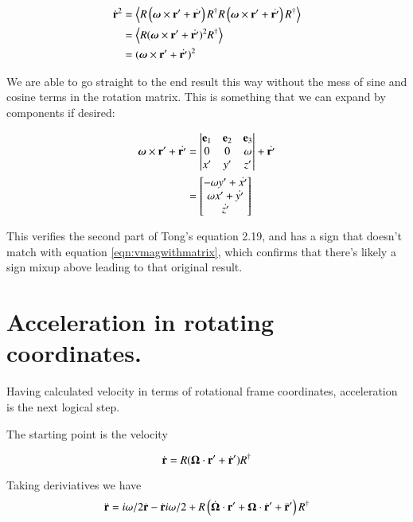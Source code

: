 \documentclass{article}      %
\newcommand{\dt}[1]{\dot{#1}}
\newcommand{\ddt}[1]{\ddot{#1}}
\newcommand{\gpscalargrade}[1] {{\left\langle{{#1}}\right\rangle}}
\newcommand{\BOmega}[0]{\boldsymbol{\Omega}}
\begin{document}
\begin{align*}
\dt{\Br} ^2 
&= \gpscalargrade{ 
{R} \left( \Bomega \cross \Br' + \dt{\Br'} \right) R^\dagger
{R} \left( \Bomega \cross \Br' + \dt{\Br'} \right) R^\dagger
} \\
&= \gpscalargrade{ 
{R} ( \Bomega \cross \Br' + \dt{\Br'} ) ^2 R^\dagger
} \\
&= ( \Bomega \cross \Br' + \dt{\Br'} ) ^2 \\
\end{align*}

We are able to go straight to the end result this way without the mess
of sine and cosine terms in the rotation matrix.  This is something that
we can expand by components if desired:

\begin{align*}
\Bomega \cross \Br' + \dt{\Br'}
&= 
\begin{vmatrix}
\Be_1 & \Be_2 & \Be_3 \\
0 & 0 & \omega \\
x' & y' & z' \\
\end{vmatrix}
+ \dt{\Br'} \\
&=
\begin{bmatrix}
-\omega y' + \dt{x'} \\
\omega x' + \dt{y'} \\
 \dt{z'} \\
\end{bmatrix}
\end{align*}

This verifies the second part of Tong's equation 2.19, and has a sign that
doesn't match with equation \ref{eqn:vmagwithmatrix}, which confirms that
there's likely a sign mixup above leading to that original result.

\section{ Acceleration in rotating coordinates. }

Having calculated velocity in terms of rotational frame coordinates, acceleration is the next
logical step.

The starting point is the velocity

\[
\dt{\Br} = R ( \BOmega \cdot \Br' + \dt{\Br}' ) R^\dagger
\]

Taking deriviatives we have
\[
\ddt{\Br} = i \omega /2 \dt{\Br} - \dt{\Br} i \omega /2 + R \left( \dot{\BOmega} \cdot \Br' + \BOmega \cdot \dt{\Br}' + \ddt{\Br}' \right) R^\dagger
\]
\end{document}
